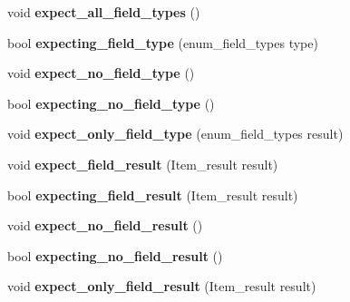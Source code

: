 \begin{DoxyCompactItemize}
void {\bfseries expect\+\_\+all\+\_\+field\+\_\+types} ()
\item 
\mbox{\label{classNdb__expect__stack_a32ef712e914cdad2cf0729c45d8f397c}} 
bool {\bfseries expecting\+\_\+field\+\_\+type} (enum\+\_\+field\+\_\+types type)
\item 
\mbox{\label{classNdb__expect__stack_a7e970a79134996fe6f7c5a4321d7f396}} 
void {\bfseries expect\+\_\+no\+\_\+field\+\_\+type} ()
\item 
\mbox{\label{classNdb__expect__stack_a5514e11b1b3705af76f3f5ee3d5e5dab}} 
bool {\bfseries expecting\+\_\+no\+\_\+field\+\_\+type} ()
\item 
\mbox{\label{classNdb__expect__stack_a4f616a4d122ea4eccc14ea50302d8a05}} 
void {\bfseries expect\+\_\+only\+\_\+field\+\_\+type} (enum\+\_\+field\+\_\+types result)
\item 
\mbox{\label{classNdb__expect__stack_a4607ef4aa3c514e07ee4f761dd097b07}} 
void {\bfseries expect\+\_\+field\+\_\+result} (Item\+\_\+result result)
\item 
\mbox{\label{classNdb__expect__stack_ae1622a7bd3a445f16d75069fa9deced9}} 
bool {\bfseries expecting\+\_\+field\+\_\+result} (Item\+\_\+result result)
\item 
\mbox{\label{classNdb__expect__stack_a7bc16a2fb1bf120bcdcabd603bce046d}} 
void {\bfseries expect\+\_\+no\+\_\+field\+\_\+result} ()
\item 
\mbox{\label{classNdb__expect__stack_ad51bec3d4c6a35147d4c011f6bcd0fb3}} 
bool {\bfseries expecting\+\_\+no\+\_\+field\+\_\+result} ()
\item 
\mbox{\label{classNdb__expect__stack_ae360eac1d82b6cd685c33d591eaf763d}} 
void {\bfseries expect\+\_\+only\+\_\+field\+\_\+result} (Item\+\_\+result result)
\item 
\mbox{\label{classNdb__expect__stack_a22ac6d6c07a58a30cf5b0b04a182a147}} 

\end{DoxyCompactItemize}
